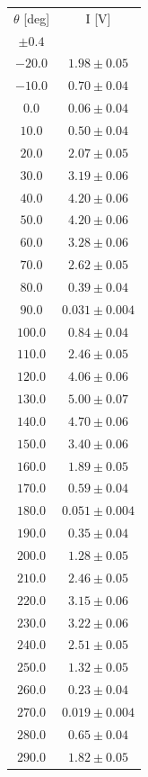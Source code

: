 \documentclass[10pt,oneside,a4paper]{article}
\begin{document}
\begin{table}[H]
\centering
{}
\label{tab:malus2}
\begin{tabular}{cc}
\hline
 $\theta$ [deg]& I [V]\\
 $\pm 0.4$ & \\
\hline
  $-20.0 $&$ 1.98 \pm 0.05$ \\
  $-10.0 $&$ 0.70 \pm 0.04$ \\
  $  0.0 $& $0.06  \pm0.04 $\\
  $ 10.0 $&$ 0.50 \pm 0.04$ \\
  $  20.0$ &$ 2.07 \pm 0.05$ \\
  $ 30.0 $&$ 3.19 \pm 0.06$ \\
  $ 40.0 $&$ 4.20 \pm 0.06$ \\
  $ 50.0 $&$ 4.20 \pm 0.06$ \\
  $ 60.0 $&$ 3.28 \pm 0.06$ \\
  $ 70.0 $&$ 2.62 \pm 0.05$ \\
  $ 80.0 $&$ 0.39 \pm 0.04$ \\
  $ 90.0 $&$ 0.031 \pm 0.004$ \\
  $100.0$ &$ 0.84 \pm 0.04$ \\
  $110.0$ &$ 2.46 \pm 0.05$ \\
  $120.0$ &$ 4.06 \pm 0.06$ \\
  $130.0$ &$ 5.00 \pm 0.07$ \\
  $140.0$ &$ 4.70 \pm 0.06$ \\
  $150.0$ &$ 3.40 \pm0.06$ \\
  $160.0$ &$ 1.89 \pm0.05$ \\
  $170.0$ &$ 0.59 \pm 0.04$ \\
  $180.0$ &$ 0.051 \pm 0.004$ \\
  $190.0$ &$ 0.35 \pm 0.04$ \\
  $200.0$ &$ 1.28 \pm 0.05$ \\
  $210.0$ &$ 2.46 \pm 0.05$ \\
  $220.0$ &$ 3.15 \pm 0.06$ \\
  $230.0$ &$ 3.22 \pm 0.06$ \\
  $240.0$ &$ 2.51 \pm 0.05$ \\
  $250.0$ &$ 1.32 \pm 0.05$ \\
  $260.0$ &$ 0.23 \pm 0.04$ \\
  $270.0$ &$ 0.019 \pm 0.004$ \\
  $280.0$ &$ 0.65 \pm 0.04$ \\
  $290.0$ &$ 1.82 \pm 0.05$ \\

\end{tabular}
\end{table}
\end{document}
